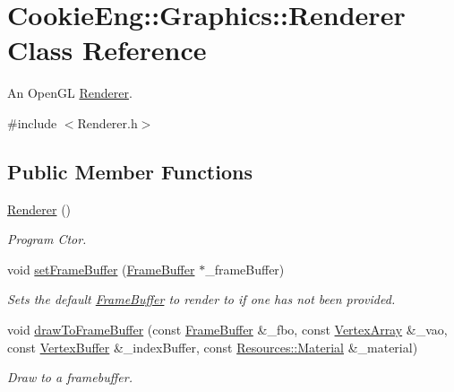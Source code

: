 \hypertarget{class_cookie_eng_1_1_graphics_1_1_renderer}{}\section{Cookie\+Eng\+:\+:Graphics\+:\+:Renderer Class Reference}
\label{class_cookie_eng_1_1_graphics_1_1_renderer}


An Open\+GL \hyperlink{class_cookie_eng_1_1_graphics_1_1_renderer}{Renderer}.  




{\ttfamily \#include $<$Renderer.\+h$>$}

\subsection*{Public Member Functions}
\begin{DoxyCompactItemize}
\item 
\hyperlink{class_cookie_eng_1_1_graphics_1_1_renderer_a255e78964e0d0ff7efd26e60a6612f39}{Renderer} ()
\begin{DoxyCompactList}\small\item\em Program Ctor. \end{DoxyCompactList}\item 
void \hyperlink{class_cookie_eng_1_1_graphics_1_1_renderer_a9e8bce3cb731b1f09ca5bc4bc863414b}{set\+Frame\+Buffer} (\hyperlink{class_cookie_eng_1_1_graphics_1_1_frame_buffer}{Frame\+Buffer} $\ast$\+\_\+frame\+Buffer)
\begin{DoxyCompactList}\small\item\em Sets the default \hyperlink{class_cookie_eng_1_1_graphics_1_1_frame_buffer}{Frame\+Buffer} to render to if one has not been provided. \end{DoxyCompactList}\item 
void \hyperlink{class_cookie_eng_1_1_graphics_1_1_renderer_aa32e62971f191a434ab457f9ac84ac31}{draw\+To\+Frame\+Buffer} (const \hyperlink{class_cookie_eng_1_1_graphics_1_1_frame_buffer}{Frame\+Buffer} \&\+\_\+fbo, const \hyperlink{class_cookie_eng_1_1_graphics_1_1_vertex_array}{Vertex\+Array} \&\+\_\+vao, const \hyperlink{class_cookie_eng_1_1_graphics_1_1_vertex_buffer}{Vertex\+Buffer} \&\+\_\+index\+Buffer, const \hyperlink{class_cookie_eng_1_1_resources_1_1_material}{Resources\+::\+Material} \&\+\_\+material)
\begin{DoxyCompactList}\small\item\em Draw to a framebuffer. \end{DoxyCompactList}\end{DoxyCompactItemize}
